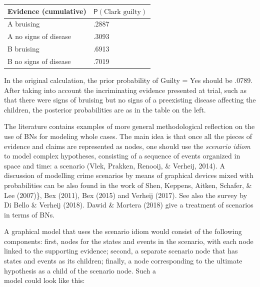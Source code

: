 \documentclass[11pt,dvipsnames,enabledeprecatedfontcommands]{scrartcl}
\newcommand{\pr}[1]{\mathsf{P}(#1)}
\begin{document}
\begin{minipage}[c]{0.4\linewidth}
\begin{table}[H]
\centering
\begin{tabular}{@{}ll@{}}
\toprule
Evidence (cumulative) & $\pr{\textrm{Clark guilty}}$ 
\\ \midrule 
A bruising& .2887\\
A no signs of disease & .3093\\
B bruising & .6913\\
B no signs of disease  & .7019\\
 \bottomrule
\end{tabular}
\end{table}
\end{minipage} \begin{minipage}[c]{0.58\linewidth}
In the  original calculation, the prior probability of \textrm{Guilty = Yes} should be .0789. After taking into account the incriminating evidence presented at trial, such as that there were signs of bruising but no signs of a preexisting disease affecting the children, the posterior probabilities are as in the table on the left.
\end{minipage}

\vspace{2mm}

The literature contains examples of more general methodological
reflection on the use of BNs for modeling whole cases. The main idea is
that once all the pieces of evidence and claims are represented as
nodes, one should use the \textit{scenario idiom} to model complex
hypotheses, consisting of a sequence of events organized in space and
time: a scenario (Vlek, Prakken, Renooij, \& Verheij, 2014). A
discussion of modelling crime scenarios by means of graphical devices
mixed with probabilities can be also found in the work of Shen, Keppens,
Aitken, Schafer, \& Lee (2007)\}, Bex (2011), Bex (2015) and Verheij
(2017). See also the survey by Di Bello \& Verheij (2018). Dawid \&
Mortera (2018) give a treatment of scenarios in terms of BNs.

A graphical model that uses the scenario idiom would consist of the
following components: first, nodes for the states and events in the
scenario, with each node linked to the supporting evidence; second, a
separate scenario node that has states and events as its children;
finally, a node corresponding to the ultimate hypothesis as a child of
the scenario node. Such a\\
model could look like this:
\end{document}
